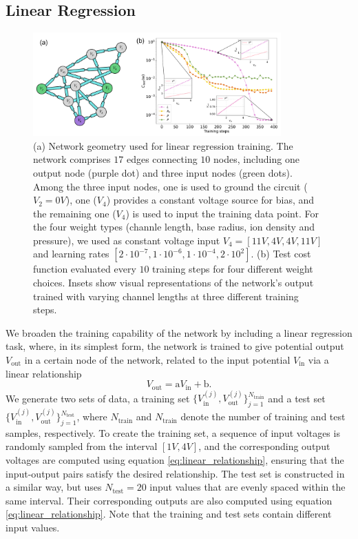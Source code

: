 \documentclass[reprint,superscriptaddress,prb,showkeys]{revtex4-2}
\begin{document}
\subsection{\label{sec:linear_regression}Linear Regression}
\begin{figure}[t]
    \centering
    \includegraphics[width=0.85\textwidth]{plots/regression/regression_G00010001.pdf}
    \caption{(a) Network geometry used for linear regression training. The network comprises $17$ edges connecting $10$ nodes, including one output node (purple dot) and three input nodes (green dots). Among the three input nodes, one is used to ground the circuit ($V_2 = 0V$), one ($V_4$) provides a constant voltage source for bias, and the remaining one ($V_4$) is used to input the training data point. For the four weight types (channle length, base radius, ion density and pressure), we used as constant voltage input $V_4 = [11V,4V,4V,11V]$ and learning rates $[2\cdot 10^{-7}, 1\cdot 10^{-6}, 1\cdot 10^{-4}, 2\cdot 10^{2}]$. (b) Test cost function evaluated every $10$ training steps for four different weight choices. Insets show visual representations of the network’s output trained with varying channel lengths at three different training steps.}\label{fig:lin_regr1}
\end{figure}

We broaden the training capability of the network by including a linear regression task, where, in its simplest form, the network is trained to give potential output $V_{\text{out}}$ in a certain node of the network, related to the input potential $V_{\text{in}}$ via a linear relationship
\begin{equation}
    V_{\text{out}} = \text{a} V_{\text{in}} + \text{b}.
\label{eq:linear_relationship}
\end{equation}
We generate two sets of data, a training set $ \{ V_{\text{in}}^{(j)}, V_{\text{out}}^{(j)} \}_{j=1}^{N_{\text{train}}}$ and a test set $ \{ V_{\text{in}}^{(j)}, V_{\text{out}}^{(j)} \}_{j=1}^{N_{\text{test}}}$, where $N_{\text{train}}$ and $N_{\text{train}}$ denote the number of training and test samples, respectively. To create the training set, a sequence of input voltages is randomly sampled from the interval $[1V, 4V]$, and the corresponding output voltages are computed using equation \cref{eq:linear_relationship}, ensuring that the input-output pairs satisfy the desired relationship.
The test set is constructed in a similar way, but uses $N_{\text{test}}=20$ input values that are evenly spaced within the same interval. Their corresponding outputs are also computed using equation \cref{eq:linear_relationship}. Note that the training and test sets contain different input values.
\end{document}
